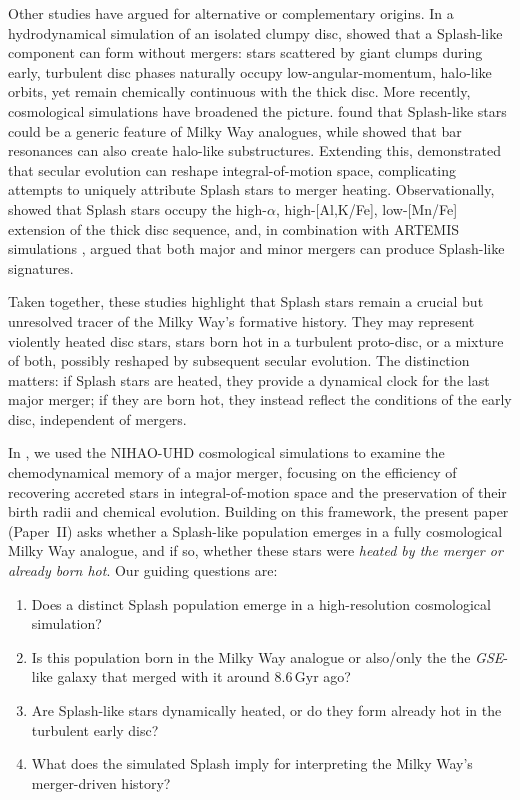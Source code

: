 \documentclass[fleqn,usenatbib]{mnras}
\begin{document}
Other studies have argued for alternative or complementary origins. In a hydrodynamical simulation of an isolated clumpy disc, \citet{Amarante2020} showed that a Splash-like component can form without mergers: stars scattered by giant clumps during early, turbulent disc phases naturally occupy low-angular-momentum, halo-like orbits, yet remain chemically continuous with the thick disc. More recently, cosmological simulations have broadened the picture. \citet{Dillamore2022} found that Splash-like stars could be a generic feature of Milky Way analogues, while \citet{Dillamore2023} showed that bar resonances can also create halo-like substructures. Extending this, \citet{Dillamore2025} demonstrated that secular evolution can reshape integral-of-motion space, complicating attempts to uniquely attribute Splash stars to merger heating. Observationally, \citet{Kisku2025} showed that Splash stars occupy the high-$\alpha$, high-[Al,K/Fe], low-[Mn/Fe] extension of the thick disc sequence, and, in combination with ARTEMIS simulations \citep{Font2020}, argued that both major and minor mergers can produce Splash-like signatures.

Taken together, these studies highlight that Splash stars remain a crucial but unresolved tracer of the Milky Way’s formative history. They may represent violently heated disc stars, stars born hot in a turbulent proto-disc, or a mixture of both, possibly reshaped by subsequent secular evolution. The distinction matters: if Splash stars are heated, they provide a dynamical clock for the last major merger; if they are born hot, they instead reflect the conditions of the early disc, independent of mergers.

In \citet[][hereafter Paper~I]{Buder2025c}, we used the NIHAO-UHD cosmological simulations \citep{Buck2020, Buck2021} to examine the chemodynamical memory of a major merger, focusing on the efficiency of recovering accreted stars in integral-of-motion space and the preservation of their birth radii and chemical evolution. Building on this framework, the present paper (Paper~II) asks whether a Splash-like population emerges in a fully cosmological Milky Way analogue, and if so, whether these stars were \emph{heated by the merger or already born hot}. Our guiding questions are:
\begin{enumerate}[leftmargin=2em,labelwidth=0em]
    \item Does a distinct Splash population emerge in a high-resolution cosmological simulation?
    \item Is this population born in the Milky Way analogue or also/only the the \textit{GSE}-like galaxy that merged with it around $8.6\,\mathrm{Gyr}$ ago?
    \item Are Splash-like stars dynamically heated, or do they form already hot in the turbulent early disc?
    \item What does the simulated Splash imply for interpreting the Milky Way’s merger-driven history?
\end{enumerate}
\end{document}
